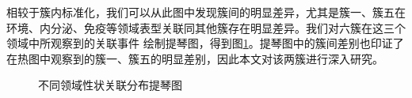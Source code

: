 相较于簇内标准化，我们可以从此图中发现簇间的明显差异，尤其是簇一、簇五在环境、内分泌、免疫等领域表型关联同其他簇存在明显差异。我们对六簇在这三个领域中所观察到的关联事件
绘制提琴图，得到图\ref{fig:violine}。提琴图中的簇间差别也印证了在热图中观察到的簇一、簇五的明显差别，因此本文对该两簇进行深入研究。

\begin{figure}[htbp]
	\centering
	\caption{不同领域性状关联分布提琴图}
	\label{fig:violine}
\end{figure}
	

